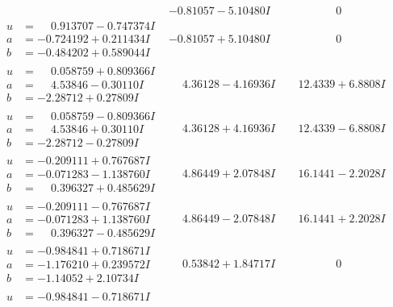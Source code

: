 \documentclass[1p]{elsarticle_modified}
\theoremstyle{definition}
\begin{document}
$$\begin{array}{c|c|c}
 & -0.81057 - 5.10480 I & \phantom{-0.000000 } 0 \\ \hline\begin{aligned}
u &= \phantom{-}0.913707 - 0.747374 I \\
a &= -0.724192 + 0.211434 I \\
b &= -0.484202 + 0.589044 I\end{aligned}
 & -0.81057 + 5.10480 I & \phantom{-0.000000 } 0 \\ \hline\begin{aligned}
u &= \phantom{-}0.058759 + 0.809366 I \\
a &= \phantom{-}4.53846 - 0.30110 I \\
b &= -2.28712 + 0.27809 I\end{aligned}
 & \phantom{-}4.36128 - 4.16936 I & \phantom{-}12.4339 + 6.8808 I \\ \hline\begin{aligned}
u &= \phantom{-}0.058759 - 0.809366 I \\
a &= \phantom{-}4.53846 + 0.30110 I \\
b &= -2.28712 - 0.27809 I\end{aligned}
 & \phantom{-}4.36128 + 4.16936 I & \phantom{-}12.4339 - 6.8808 I \\ \hline\begin{aligned}
u &= -0.209111 + 0.767687 I \\
a &= -0.071283 - 1.138760 I \\
b &= \phantom{-}0.396327 + 0.485629 I\end{aligned}
 & \phantom{-}4.86449 + 2.07848 I & \phantom{-}16.1441 - 2.2028 I \\ \hline\begin{aligned}
u &= -0.209111 - 0.767687 I \\
a &= -0.071283 + 1.138760 I \\
b &= \phantom{-}0.396327 - 0.485629 I\end{aligned}
 & \phantom{-}4.86449 - 2.07848 I & \phantom{-}16.1441 + 2.2028 I \\ \hline\begin{aligned}
u &= -0.984841 + 0.718671 I \\
a &= -1.176210 + 0.239572 I \\
b &= -1.14052 + 2.10734 I\end{aligned}
 & \phantom{-}0.53842 + 1.84717 I & \phantom{-0.000000 } 0 \\ \hline\begin{aligned}
u &= -0.984841 - 0.718671 I \\

\end{aligned}
\end{array}$$
\end{document}
